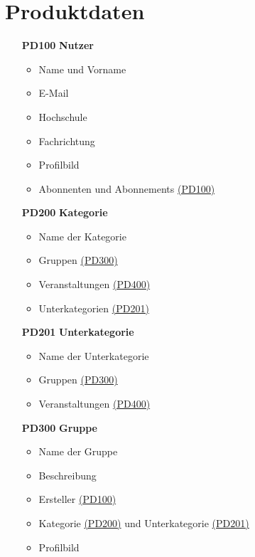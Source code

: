 \documentclass[parskip=full]{scrartcl}
\begin{document}
		\section{Produktdaten}
		\begin{itemize}
			\item[\textbf{PD100}] \textbf{Nutzer} \label{sec:PD100}
			\begin{itemize}[nosep]
				\item Name und Vorname
				\item E-Mail
				\item Hochschule
				\item Fachrichtung
				\item Profilbild
				\item \gls{Abonnenten} und \gls{Abonnements} \hyperref[sec:PD100]{(PD100)}
			\end{itemize}
			\item[\textbf{PD200}] \textbf{\gls{Kategorie}} \label{sec:PD200}
			\begin{itemize}[nosep]
				\item Name der \gls{Kategorie}
				\item Gruppen \hyperref[sec:PD300]{(PD300)}
				\item Veranstaltungen \hyperref[sec:PD400]{(PD400)}
				\item \gls{Unterkategorie}n \hyperref[sec:PD201]{(PD201)}
			\end{itemize}
			\item[\textbf{PD201}] \textbf{\gls{Unterkategorie}} \label{sec:PD201}
			\begin{itemize}[nosep]
				\item Name der \gls{Unterkategorie}
				\item Gruppen \hyperref[sec:PD300]{(PD300)}
				\item Veranstaltungen \hyperref[sec:PD400]{(PD400)}
			\end{itemize}
			\item[\textbf{PD300}] \textbf{Gruppe} \label{sec:PD300}
			\begin{itemize}
				\item Name der Gruppe
				\item Beschreibung
				\item Ersteller \hyperref[sec:PD100]{(PD100)}
				\item \gls{Kategorie} \hyperref[sec:P200]{(PD200)} und \gls{Unterkategorie} \hyperref[sec:PD201]{(PD201)}
				\item Profilbild
			\end{itemize}

\end{itemize}
\end{document}

